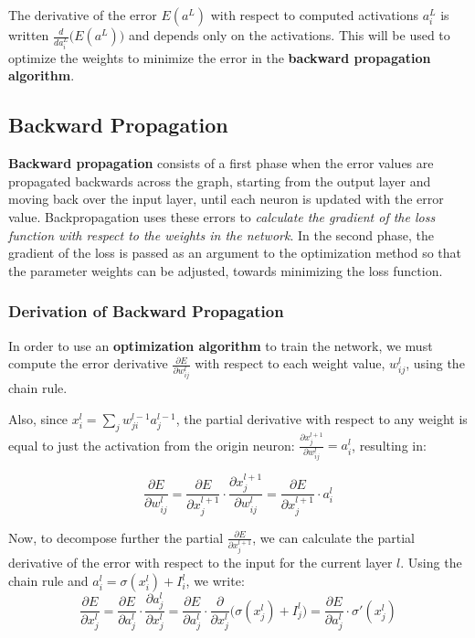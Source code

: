 The derivative of the error $E(a^L)$ with respect to computed activations $a_i^L$ is written $\frac {d} {d a_i^L} \Bigg( E(a^L) \Bigg)$ and depends only on the activations. This will be used to optimize the weights to minimize the error in the \textbf{backward propagation algorithm}.
    

\subsection{Backward Propagation} \label{sec:BackwardProp}

\textbf{Backward propagation} consists of a first phase when the error values are propagated backwards across the graph, starting from the output layer and moving back over the input layer, until each neuron is updated with the error value. Backpropagation uses these errors to \emph{calculate the gradient of the loss function with respect to the weights in the network}. In the second phase, the gradient of the loss is passed as an argument to the optimization method so that the parameter weights can be adjusted, towards minimizing the loss function. 

\subsubsection{Derivation of Backward Propagation}

In order to use an \textbf{optimization algorithm} to train the network, we must compute the error derivative $\frac {\partial E} {\partial w_{ij}^l} $ with respect to each weight value, $w_{ij}^l$, using the chain rule. 

Also, since $x_i^l = \sum_j w_{ji}^{l-1} a_j^{l-1}$, the partial derivative with respect to any weight is equal to just the activation from the origin neuron: $\frac {\partial x_j^{l+1}} {\partial w_{ij}^l} = a_i^l$, resulting in:

$$
\frac {\partial E} {\partial w_{ij}^l} 
= \frac {\partial E} {\partial x_j^{l+1} } \cdot \frac {\partial x_j^{l+1}} {\partial w_{ij}^l} 
= \frac {\partial E} {\partial x_j^{l+1} } \cdot a_i^l
$$

Now, to decompose further the partial $\frac {\partial E} {\partial x_j^{l+1} }$, we can calculate the partial derivative of the error with respect to the input for the current layer $l$. Using the chain rule and $a_i^l = \sigma(x_i^l) + I_i^l$, we write:
$$
\frac {\partial E} {\partial x_j^l } = \frac {\partial E} {\partial a_j^l } \cdot \frac {\partial a_j^l} {\partial x_j^l }
= \frac {\partial E} {\partial a_j^l } \cdot  \frac {\partial} {\partial x_j^l } \Big( \sigma(x_j^l) + I_j^l \Big)
= \frac {\partial E} {\partial a_j^l }\cdot \sigma '(x_j^l)
$$

